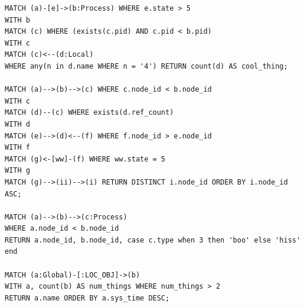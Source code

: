 \documentclass[letterpaper]{ltxdoc}
\begin{document}
\begin{verbatim}
MATCH (a)-[e]->(b:Process) WHERE e.state > 5
WITH b
MATCH (c) WHERE (exists(c.pid) AND c.pid < b.pid)
WITH c
MATCH (c)<--(d:Local)
WHERE any(n in d.name WHERE n = '4') RETURN count(d) AS cool_thing;

MATCH (a)-->(b)-->(c) WHERE c.node_id < b.node_id
WITH c
MATCH (d)--(c) WHERE exists(d.ref_count)
WITH d
MATCH (e)-->(d)<--(f) WHERE f.node_id > e.node_id
WITH f
MATCH (g)<-[ww]-(f) WHERE ww.state = 5
WITH g
MATCH (g)-->(ii)-->(i) RETURN DISTINCT i.node_id ORDER BY i.node_id ASC;

MATCH (a)-->(b)-->(c:Process)
WHERE a.node_id < b.node_id
RETURN a.node_id, b.node_id, case c.type when 3 then 'boo' else 'hiss' end

MATCH (a:Global)-[:LOC_OBJ]->(b)
WITH a, count(b) AS num_things WHERE num_things > 2
RETURN a.name ORDER BY a.sys_time DESC;
\end{verbatim}

\end{document}
